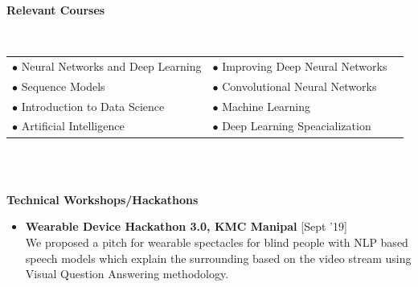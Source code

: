 \documentclass[a4paper,10pt]{article}
\begin{document}
\colorbox{titleColor}{\parbox{6.7in}{\textbf{Relevant Courses}}}\\[0.08in]
\begin{tabular}{p{3.5in}p{3in}p{2.5in}}
\hspace{0.9pc}$\bullet$ Neural Networks and Deep Learning &$\bullet$ Improving Deep Neural Networks\\[0.05in]
\hspace{0.9pc}$\bullet$ Sequence Models &$\bullet$ Convolutional Neural Networks\\[0.05in]
\hspace{0.9pc}$\bullet$ Introduction to Data Science&$\bullet$ Machine Learning \\[0.05in]
\hspace{0.9pc}$\bullet$ Artificial Intelligence&$\bullet$ Deep Learning Speacialization \\[0.05in]
\end{tabular}
\\\\




\colorbox{titleColor}{\parbox{6.7in}{\textbf{Technical Workshops/Hackathons}}}

\begin{itemize}
  \setlength{\itemsep}{1pt}
  \item \textbf{Wearable Device Hackathon 3.0, KMC Manipal}
  \hfill {\small{{[Sept '19]}}\/} 
  \\We proposed a pitch for wearable spectacles for blind people with NLP based speech models which explain the surrounding based on the video stream using Visual Question Answering methodology.



\end{itemize}
\end{document}
